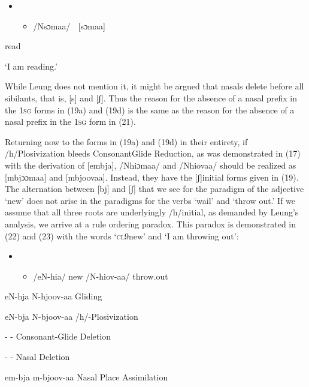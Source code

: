 \begin{itemize}
\item \setcounter{itemize}{0}
\begin{itemize}
\item /Nsɔmaa/    [sɔmaa]

\end{itemize}
\end{itemize}

read

‘I am reading.’

While Leung does not mention it, it might be argued that nasals delete before all sibilants, that is, [s] and [ʃ]. Thus the reason for the absence of a nasal prefix in the 1\textsc{sg} forms in (19a) and (19d) is the same as the reason for the absence of a nasal prefix in the 1\textsc{sg} form in (21). 

Returning now to the forms in (19a) and (19d) in their entirety, if /h/Plosivization bleeds ConsonantGlide Reduction, as was demonstrated in (17) with the derivation of [embja], /Nhiɔmaa/ and /Nhiovaa/ should be realized as [mbjɔɔmaa] and [mbjoovaa]. Instead, they have the [ʃ]initial forms given in (19). The alternation between [bj] and [ʃ] that we see for the paradigm of the adjective ‘new’ does not arise in the paradigms for the verbs ‘wail’ and ‘throw out.’ If we assume that all three roots are underlyingly /h/initial, as demanded by Leung’s analysis, we arrive at a rule ordering paradox. This paradox is demonstrated in (22) and (23) with the words ‘\textsc{cl}9new’ and ‘I am throwing out\textsc{’}:

\begin{itemize}
\item \setcounter{itemize}{0}
\begin{itemize}
\item /eN-hia/  new  /N-hiov-aa/  throw.out

\end{itemize}
\end{itemize}

eN-hja      N-hjoov-aa        Gliding

eN-bja      N-bjoov-aa        /h/-Plosivization

{}-        {}-          Consonant-Glide Deletion

{}-        {}-          Nasal Deletion

em-bja      m-bjoov-aa        Nasal Place Assimilation


